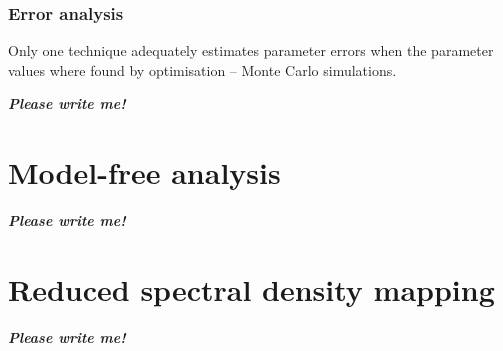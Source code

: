 

\subsubsection{Error analysis}

Only one technique adequately estimates parameter errors when the parameter values where found by optimisation -- Monte Carlo simulations.

\textbf{\textit{Please write me!}}




\newpage
\section{Model-free analysis}

\textbf{\textit{Please write me!}}



\newpage
\section{Reduced spectral density mapping}

\textbf{\textit{Please write me!}}
